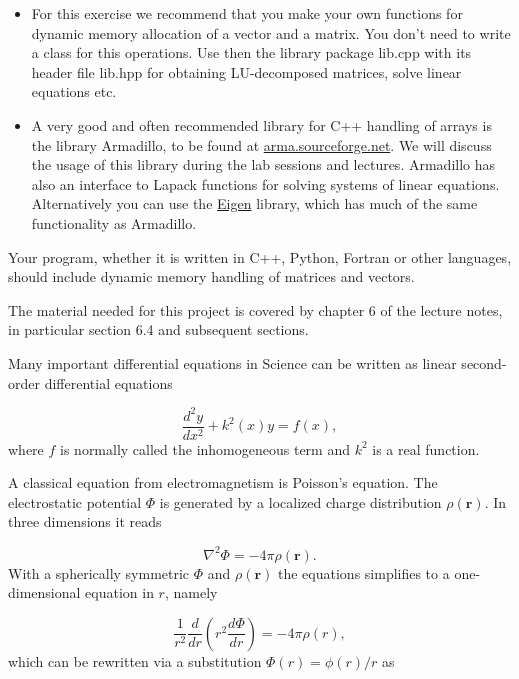 \documentclass[%
oneside,                 %
final,                   %
10pt]{article}
\begin{document}
\begin{itemize}
  \item For this exercise we recommend that you make your own functions for dynamic memory allocation of a  vector and a matrix. You don't need to write a class for this operations.  Use then the  library package lib.cpp with its header file  lib.hpp for obtaining LU-decomposed matrices, solve linear equations etc.

  \item A very good and often recommended library for C++ handling of arrays is the library Armadillo, to be found at \url{arma.sourceforge.net}.  We will discuss the usage of this library during the lab sessions and lectures. Armadillo has also an interface to Lapack functions for solving systems of linear equations. Alternatively you can use the \href{{http://eigen.tuxfamily.org/index.php?title=Main_Page}}{Eigen} library, which has much of the same functionality as Armadillo.
\end{itemize}

\noindent
Your program, whether it is written in C++, Python, Fortran or other languages, should include
dynamic memory handling of matrices and vectors. 

The material needed for this project is covered by chapter 6 of the lecture notes, in particular section 6.4 and subsequent sections.



Many important differential equations in  Science can be written as 
linear second-order differential equations

\begin{equation*}
\frac{d^2y}{dx^2}+k^2(x)y = f(x),
\end{equation*}
where $f$ is normally called the inhomogeneous term and $k^2$ is a real function.

A classical equation from electromagnetism is Poisson's equation.
The electrostatic potential $\Phi$ is generated by a localized charge
distribution $\rho (\mathbf{r})$.   In three dimensions 
it reads

\begin{equation*}
\nabla^2 \Phi = -4\pi \rho (\mathbf{r}).
\end{equation*}
With a spherically symmetric $\Phi$ and $\rho (\mathbf{r})$  the equations
simplifies to a one-dimensional equation in $r$, namely

\begin{equation*}
\frac{1}{r^2}\frac{d}{dr}\left(r^2\frac{d\Phi}{dr}\right) = -4\pi \rho(r),
\end{equation*}
which can be rewritten via a substitution $\Phi(r)= \phi(r)/r$ as
\end{document}
